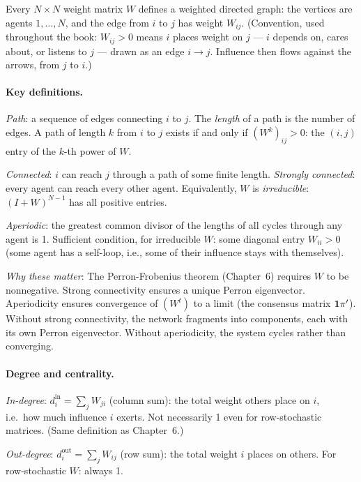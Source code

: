 \documentclass[../structural_economics_book.tex]{subfiles}
\begin{document}
Every $N \times N$ weight matrix $W$ defines a weighted directed graph: the vertices are agents $1, \ldots, N$, and the edge from $i$ to $j$ has weight $W_{ij}$. (Convention, used throughout the book: $W_{ij} > 0$ means $i$ places weight on $j$ --- $i$ depends on, cares about, or listens to $j$ --- drawn as an edge $i \to j$. Influence then flows against the arrows, from $j$ to $i$.)

\paragraph{Key definitions.}

\textit{Path}: a sequence of edges connecting $i$ to $j$. The \textit{length} of a path is the number of edges. A path of length $k$ from $i$ to $j$ exists if and only if $(W^k)_{ij} > 0$: the $(i,j)$ entry of the $k$-th power of $W$.

\textit{Connected}: $i$ can reach $j$ through a path of some finite length. \textit{Strongly connected}: every agent can reach every other agent. Equivalently, $W$ is \textit{irreducible}: $(I + W)^{N-1}$ has all positive entries.

\textit{Aperiodic}: the greatest common divisor of the lengths of all cycles through any agent is 1. Sufficient condition, for irreducible $W$: some diagonal entry $W_{ii} > 0$ (some agent has a self-loop, i.e., some of their influence stays with themselves).

\textit{Why these matter}: The Perron-Frobenius theorem (Chapter~6) requires $W$ to be nonnegative. Strong connectivity ensures a unique Perron eigenvector. Aperiodicity ensures convergence of $(W^t)$ to a limit (the consensus matrix $\mathbf{1}\pi'$). Without strong connectivity, the network fragments into components, each with its own Perron eigenvector. Without aperiodicity, the system cycles rather than converging.

\paragraph{Degree and centrality.}

\textit{In-degree}: $d_i^{\text{in}} = \sum_j W_{ji}$ (column sum): the total weight others place on $i$, i.e.\ how much influence $i$ exerts. Not necessarily 1 even for row-stochastic matrices. (Same definition as Chapter~6.)

\textit{Out-degree}: $d_i^{\text{out}} = \sum_j W_{ij}$ (row sum): the total weight $i$ places on others. For row-stochastic $W$: always 1.
\end{document}
